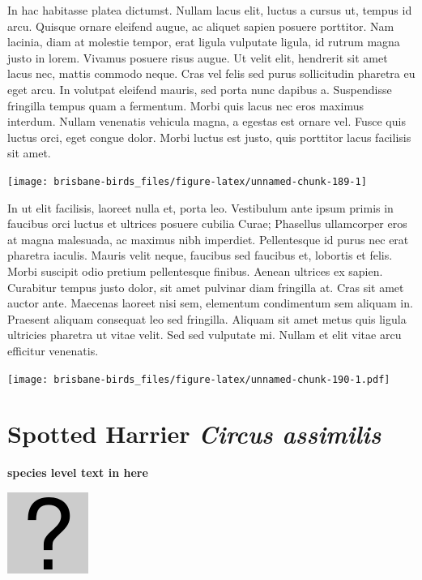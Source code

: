 \documentclass[]{book}
\let\origfigure\figure
\let\endorigfigure\endfigure
\renewenvironment{figure}[1][2] {
  \expandafter\origfigure\expandafter[H]
} {
  \endorigfigure
}
\begin{document}
In hac habitasse platea dictumst. Nullam lacus elit, luctus a cursus ut,
tempus id arcu. Quisque ornare eleifend augue, ac aliquet sapien posuere
porttitor. Nam lacinia, diam at molestie tempor, erat ligula vulputate
ligula, id rutrum magna justo in lorem. Vivamus posuere risus augue. Ut
velit elit, hendrerit sit amet lacus nec, mattis commodo neque. Cras vel
felis sed purus sollicitudin pharetra eu eget arcu. In volutpat eleifend
mauris, sed porta nunc dapibus a. Suspendisse fringilla tempus quam a
fermentum. Morbi quis lacus nec eros maximus interdum. Nullam venenatis
vehicula magna, a egestas est ornare vel. Fusce quis luctus orci, eget
congue dolor. Morbi luctus est justo, quis porttitor lacus facilisis sit
amet.

\begin{figure}
\texttt{[image: brisbane-birds\_files/figure-latex/unnamed-chunk-189-1]} \caption{insert figure caption}\label{fig:unnamed-chunk-189}
\end{figure}

In ut elit facilisis, laoreet nulla et, porta leo. Vestibulum ante ipsum
primis in faucibus orci luctus et ultrices posuere cubilia Curae;
Phasellus ullamcorper eros at magna malesuada, ac maximus nibh
imperdiet. Pellentesque id purus nec erat pharetra iaculis. Mauris velit
neque, faucibus sed faucibus et, lobortis et felis. Morbi suscipit odio
pretium pellentesque finibus. Aenean ultrices ex sapien. Curabitur
tempus justo dolor, sit amet pulvinar diam fringilla at. Cras sit amet
auctor ante. Maecenas laoreet nisi sem, elementum condimentum sem
aliquam in. Praesent aliquam consequat leo sed fringilla. Aliquam sit
amet metus quis ligula ultricies pharetra ut vitae velit. Sed sed
vulputate mi. Nullam et elit vitae arcu efficitur venenatis.

\begin{figure}
\centering
\texttt{[image: brisbane-birds\_files/figure-latex/unnamed-chunk-190-1.pdf]}
\caption{\label{fig:unnamed-chunk-190}insert figure caption}
\end{figure}

\section{\texorpdfstring{Spotted Harrier \emph{Circus
assimilis}}{Spotted Harrier Circus assimilis}}\label{spotted-harrier-circus-assimilis}

\textbf{species level text in here}

\begin{figure}
\centering
\includegraphics{assets/missing.png}
\caption{No image for species}
\end{figure}
\end{document}
